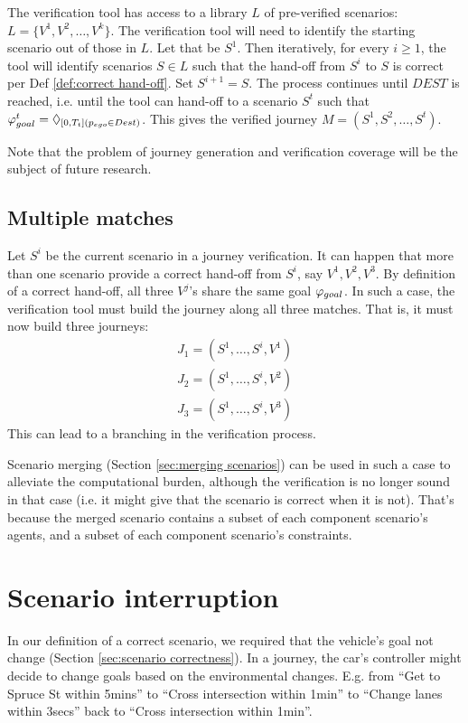 The verification tool has access to a library $L$ of pre-verified scenarios: 
$L = \{V^1,V^2,\ldots,V^k\}$.
The verification tool will need to identify the starting scenario out of those in $L$. 
Let that be $S^1$.
Then iteratively, for every $i \geq 1$, the tool will identify scenarios $S \in L$ such that the hand-off from $S^i$ to $S$ is correct per Def \ref{def:correct hand-off}.
Set $S^{i+1} = S$.
The process continues until $DEST$ is reached, i.e. until the tool can hand-off to a scenario $S^t$ such that $\varphi_{goal}^t = \Diamond_{[0,T_t](p_{ego} \in Dest)}$.
This gives the verified journey $M = (S^1,S^2,\ldots,S^t)$.

Note that the problem of journey generation and verification coverage will be the subject of future research.

\subsection{Multiple matches}
Let $S^i$ be the current scenario in a journey verification.
It can happen that more than one scenario provide a correct hand-off from $S^i$, say $V^1,V^2,V^3$.
By definition of a correct hand-off, all three $V^j$'s share the same goal $\varphi_{goal}$.
In such a case, the verification tool must build the journey along all three matches. That is, it must now build three journeys:
\begin{eqnarray*}
J_1  = (S^1,\ldots,S^i,V^1)
\\
J_2  = (S^1,\ldots,S^i,V^2)
\\
J_3  = (S^1,\ldots,S^i,V^3)
\end{eqnarray*}
This can lead to a branching in the verification process. 

Scenario merging (Section \ref{sec:merging scenarios}) can be used in such a case to alleviate the computational burden, although the verification is no longer sound in that case (i.e. it might give that the scenario is correct when it is not). 
That's because the merged scenario contains a subset of each component scenario's agents, and a subset of each component scenario's constraints.
 
\section{Scenario interruption}
\label{sec:scenario interruption}
In our definition of a correct scenario, we required that the vehicle's goal not change (Section \ref{sec:scenario correctness}).
In a journey, the car's controller might decide to change goals based on the environmental changes. 
E.g. from ``Get to Spruce St within 5mins'' to ``Cross intersection within 1min'' to ``Change lanes within 3secs'' back to ``Cross intersection within 1min''.


